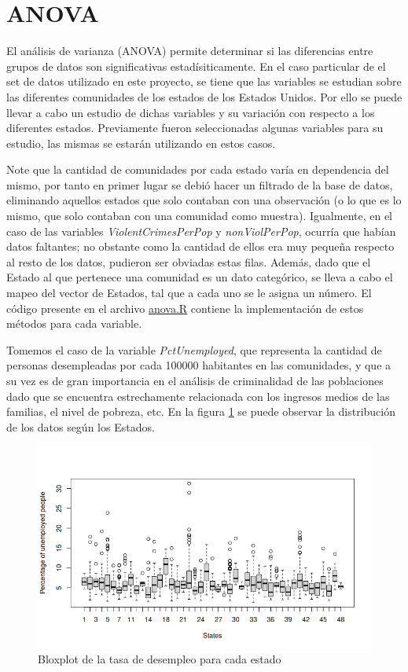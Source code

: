 \documentclass[a4paper,10pt,twocolumn]{article}
\begin{document}
\section{ANOVA}

El análisis de varianza (ANOVA) permite determinar si las diferencias entre grupos de datos son significativas estadísiticamente. En el caso particular de el set de datos utilizado en este proyecto, se tiene que las variables se estudian sobre las diferentes comunidades de los estados de los Estados Unidos. Por ello se puede llevar a cabo un estudio de dichas variables y su variación con respecto a los diferentes estados. Previamente fueron seleccionadas algunas variables para su estudio, las mismas se estarán utilizando en estos casos.

Note que la cantidad de comunidades por cada estado varía en dependencia del mismo, por tanto en primer lugar se debió hacer un filtrado de la base de datos, eliminando aquellos estados que solo contaban con una observación (o lo que es lo mismo, que solo contaban con una comunidad como muestra). Igualmente, en el caso de las variables \textit{ViolentCrimesPerPop} y \textit{nonViolPerPop}, ocurría que habían datos faltantes; no obstante como la cantidad de ellos era muy pequeña respecto al resto de los datos, pudieron ser obviadas estas filas. Además, dado que el Estado al que pertenece una comunidad es un dato categórico, se lleva a cabo el mapeo del vector de Estados, tal que a cada uno se le asigna un número. El código presente en el archivo \href{anova.R}{anova.R} contiene la implementación de estos métodos para cada variable.

Tomemos el caso de la variable \textit{PctUnemployed}, que representa la cantidad de personas desempleadas por cada 100000 habitantes en las comunidades, y que a su vez es de gran importancia en el análisis de criminalidad de las poblaciones dado que se encuentra estrechamente relacionada con los ingresos medios de las familias, el nivel de pobreza, etc. En la figura \ref{fig:unemployed_boxplot} se puede observar la distribución de los datos según los Estados.
	
\begin{figure}[htb]
	\begin{center}
		\includegraphics[width=\columnwidth]{figures/Unemployed_plot.png}
	\end{center}
	\caption{Bloxplot de la tasa de desempleo para cada estado \label{fig:unemployed_boxplot}}
\end{figure}
\end{document}
